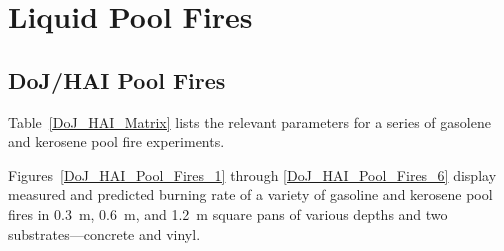 \clearpage

\section{Liquid Pool Fires}
\label{sec:Liquid_Pool_Fires_MLR}

\subsection{DoJ/HAI Pool Fires}

Table~\ref{DoJ_HAI_Matrix} lists the relevant parameters for a series of gasolene and kerosene pool fire experiments.

Figures~\ref{DoJ_HAI_Pool_Fires_1} through \ref{DoJ_HAI_Pool_Fires_6} display measured and predicted burning rate of a variety of gasoline and kerosene pool fires in 0.3~m, 0.6~m, and 1.2~m square pans of various depths and two substrates---concrete and vinyl.

\newpage

